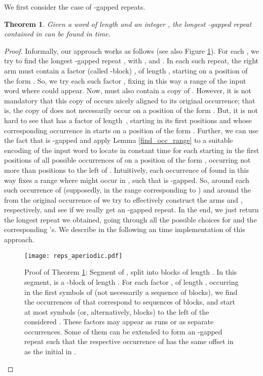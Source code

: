 \documentclass[final]{dmtcs-episciences}
\newtheorem{theorem}{Theorem}
\begin{document}
We first consider the case of -gapped repeats.
\begin{theorem}\label{algorithm_rep_case_aperiodic}
Given a word  of length  and an integer , the longest -gapped repeat  contained in  can be found in  time. 
\end{theorem}
\begin{proof}
Informally, our approach works as follows (see also Figure \ref{aper}). For each , we try to find the longest -gapped repeat , with , and . In each such repeat, the right arm  must contain a factor (called -block) , of length , starting on a position of the form . So, we try each such factor , fixing in this way a range of the input word where  could appear. Now,  must also contain a copy of . However, it is not mandatory that this copy of  occurs nicely aligned to its original occurrence; that is, the copy of  does not necessarily occur on a position of the form . But, it is not hard to see that  has a factor  of length~, starting in its first  positions and whose corresponding occurrence in  starts on a position of the form . Further, we can use the fact that  is -gapped and apply Lemma \ref{find_occ_range} to a suitable encoding of the input word to locate in constant time for each  starting in the first  positions of  all possible occurrences of  on a position of the form , occurring not more than  positions to the left of . Intuitively, each occurrence of  found in this way fixes a range where  might occur in , such that  is -gapped. So, around each such occurrence of  (supposedly, in the range corresponding to ) and around the  from the original occurrence of  we try to effectively construct the arms  and , respectively, and see if we really get an -gapped repeat. In the end, we just return the longest repeat we obtained, going through all the possible choices for  and the corresponding 's. We describe in the following an  time implementation of this approach.

\begin{figure}
\begin{center}
\texttt{[image: reps\_aperiodic.pdf]}
\end{center}
\caption{
Proof of Theorem \ref{algorithm_rep_case_aperiodic}: Segment of , split into blocks of length . In this segment,  is a -block of length . For each factor , of length , occurring in the first  symbols of  (not necessarily a sequence of blocks), we find the occurrences of  that correspond to sequences of  blocks, and start at most  symbols (or, alternatively,  blocks) to the left of the considered . These  factors may appear as runs or as separate occurrences. Some of them can be extended to form an -gapped repeat  such that the respective occurrence of  has the same offset in  as the initial  in .}
\label{aper}
\end{figure} 


\end{proof}
\end{document}
